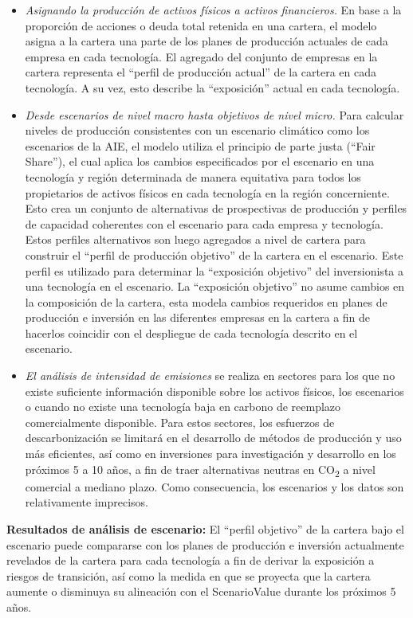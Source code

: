 \documentclass[10pt,table]{article}\usepackage[]{graphicx}\usepackage[]{color}
\begin{document}
\begin{multicols}{2}
\begin{itemize}
			\item{\textit{Asignando la producción de activos físicos a activos financieros.} En base a la proporción de acciones o deuda total retenida en una cartera, el modelo asigna a la cartera una parte de los planes de producción actuales de cada empresa en cada tecnología. El agregado del conjunto de empresas en la cartera representa el “perfil de producción actual” de la cartera en cada tecnología. A su vez, esto describe la “exposición” actual en cada tecnología.}
			
			\item{\textit{Desde escenarios de nivel macro hasta objetivos de nivel micro. }Para calcular niveles de producción consistentes con un escenario climático como los escenarios de la AIE, el modelo utiliza el principio de parte justa (“Fair Share”), el cual aplica los cambios especificados por el escenario en una tecnología y región determinada de manera equitativa para todos los propietarios de activos físicos en cada tecnología en la región concerniente. Esto crea un conjunto de alternativas de prospectivas de producción y perfiles de capacidad coherentes con el escenario para cada empresa y tecnología. Estos perfiles alternativos son luego agregados a nivel de cartera para construir el “perfil de producción objetivo” de la cartera en el escenario. Este perfil es utilizado para determinar la “exposición objetivo” del inversionista a una tecnología en el escenario. La “exposición objetivo” no asume cambios en la composición de la cartera, esta modela cambios requeridos en planes de producción e inversión en las diferentes empresas en la cartera a fin de hacerlos coincidir con el despliegue de cada tecnología descrito en el escenario. } 
			
			\item{\textit{El análisis de intensidad de emisiones} se realiza en sectores para los que no existe suficiente información disponible sobre los activos físicos, los escenarios o cuando no existe una tecnología baja en carbono de reemplazo comercialmente disponible. Para estos sectores, los esfuerzos de descarbonización se limitará en el desarrollo de métodos de producción y uso más eficientes, así como en inversiones para investigación y desarrollo en los próximos 5 a 10 años, a fin de traer alternativas neutras en CO\textsubscript{2} a nivel comercial a mediano plazo. Como consecuencia, los escenarios y los datos son relativamente imprecisos.}
				\end{itemize}
		
		\textbf{Resultados de análisis de escenario:} El “perfil objetivo” de la cartera bajo el escenario puede compararse con los planes de producción e inversión actualmente revelados de la cartera para cada tecnología a fin de derivar la exposición a riesgos de transición, así como la medida en que se proyecta que la cartera aumente o disminuya su alineación con el ScenarioValue durante los próximos 5 años.
		\newline
		
	\end{multicols}
			
\end{document}
